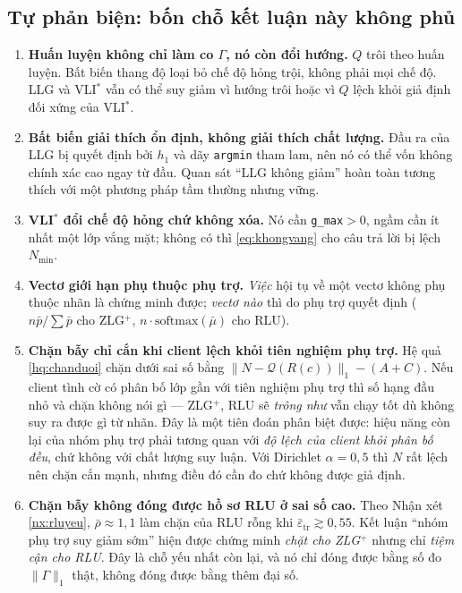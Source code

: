 \documentclass[11pt,a4paper]{article}
\theoremstyle{remark}
\newcommand{\quant}{\mathcal{Q}}
\newcommand{\epstr}{\bar\varepsilon_{\mathrm{tr}}}
\newcommand{\code}[1]{\texttt{\small #1}}
\begin{document}
\subsection{Tự phản biện: bốn chỗ kết luận này không phủ}

\begin{enumerate}
\item \textbf{Huấn luyện không chỉ làm co $\Gamma$, nó còn đổi hướng.} $Q$
  trôi theo huấn luyện. Bất biến thang độ loại bỏ chế độ hỏng trội, không
  phải mọi chế độ. LLG và VLI$^*$ vẫn có thể suy giảm vì hướng trôi hoặc vì
  $Q$ lệch khỏi giả định đối xứng của VLI$^*$.

\item \textbf{Bất biến giải thích ổn định, không giải thích chất lượng.} Đầu
  ra của LLG bị quyết định bởi $h_1$ và dãy \code{argmin} tham lam, nên nó có
  thể vốn không chính xác cao ngay từ đầu. Quan sát ``LLG không giảm'' hoàn
  toàn tương thích với một phương pháp tầm thường nhưng vững.

\item \textbf{VLI$^*$ đổi chế độ hỏng chứ không xóa.} Nó cần
  \code{g\_max}$>0$, ngầm cần ít nhất một lớp vắng mặt; không có thì
  \eqref{eq:khongvang} cho câu trả lời bị lệch $N_{\min}$.

\item \textbf{Vectơ giới hạn phụ thuộc phụ trợ.} \emph{Việc} hội tụ về một
  vectơ không phụ thuộc nhãn là chứng minh được; \emph{vectơ nào} thì do phụ
  trợ quyết định ($n\bar p/\sum\bar p$ cho ZLG$^+$,
  $n\cdot\mathrm{softmax}(\bar\mu)$ cho RLU).

\item \textbf{Chặn bẫy chỉ cắn khi client lệch khỏi tiên nghiệm phụ trợ.}
  Hệ quả \ref{hq:chanduoi} chặn dưới sai số bằng
  $\|N-\quant(R(c))\|_1-(A+C)$. Nếu client tình cờ có phân bố lớp gần với
  tiên nghiệm phụ trợ thì số hạng đầu nhỏ và chặn không nói gì --- ZLG$^+$,
  RLU sẽ \emph{trông như} vẫn chạy tốt dù không suy ra được gì từ nhãn. Đây
  là một tiên đoán phân biệt được: hiệu năng còn lại của nhóm phụ trợ phải
  tương quan với \emph{độ lệch của client khỏi phân bố đều}, chứ không với
  chất lượng suy luận. Với Dirichlet $\alpha=0{,}5$ thì $N$ rất lệch nên chặn
  cắn mạnh, nhưng điều đó cần đo chứ không được giả định.

\item \textbf{Chặn bẫy không đóng được hồ sơ RLU ở sai số cao.} Theo Nhận xét
  \ref{nx:rluyeu}, $\bar\rho\approx1{,}1$ làm chặn của RLU rỗng khi
  $\epstr\gtrsim0{,}55$. Kết luận ``nhóm phụ trợ suy giảm sớm'' hiện được
  chứng minh \emph{chặt cho ZLG$^+$} nhưng chỉ \emph{tiệm cận cho RLU}. Đây
  là chỗ yếu nhất còn lại, và nó chỉ đóng được bằng số đo $\|\Gamma\|_1$
  thật, không đóng được bằng thêm đại số.
\end{enumerate}
\end{document}

